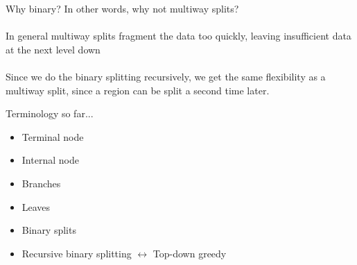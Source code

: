 \documentclass[mathserif, aspectratio=169]{beamer}
\begin{document}
\begin{frame}{Why binary?}
In other words, why not multiway splits?\\~\\

\pause
In general multiway splits fragment the data too quickly, leaving insufficient data at the next level down\\~\\

Since we do the binary splitting recursively, we get the same flexibility as a multiway split, since a region can be split a second time later.
\end{frame}


\begin{frame}{Terminology so far...}
	\begin{itemize}
		\item Terminal node
		\item Internal node
		\item Branches
		\item Leaves
		\pause
		\item Binary splits
		\item Recursive binary splitting $\leftrightarrow$ Top-down greedy 
	\end{itemize}
\end{frame}
\end{document}
